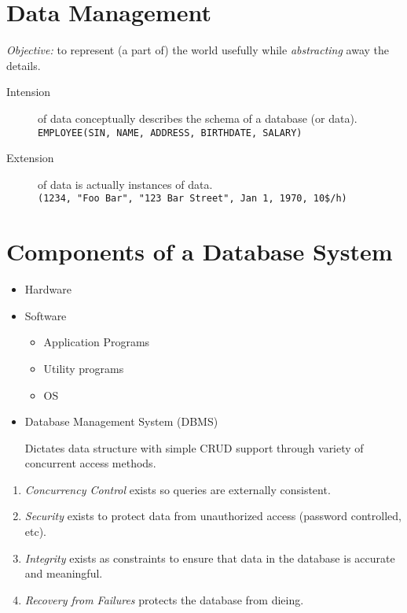             \section{Data Management} %
            \label{sec:data_management}
                \emph{Objective:} to represent (a part of) the world usefully while \emph{abstracting} away the details.
                \begin{description}
                    \item[Intension] of data conceptually describes the schema of a database (or data). \\
                        \verb|EMPLOYEE(SIN, NAME, ADDRESS, BIRTHDATE, SALARY)|
                    \item[Extension] of data is actually instances of data. \\
                        \verb|(1234, "Foo Bar", "123 Bar Street", Jan 1, 1970, 10$/h)|
                \end{description}
            \section{Components of a Database System} %
            \label{sec:components_of_a_database_system}
                \begin{itemize}
                    \item Hardware
                    \item Software
                        \begin{itemize}
                            \item Application Programs
                            \item Utility programs
                            \item OS
                        \end{itemize}
                    \item Database Management System (DBMS)

                        Dictates data structure with simple CRUD support through variety of concurrent access methods.
                \end{itemize}

                \begin{enumerate}
                    \item \emph{Concurrency Control} exists so queries are externally consistent.
                    \item \emph{Security} exists to protect data from unauthorized access (password controlled, etc).
                    \item \emph{Integrity} exists as constraints to ensure that data in the database is accurate and meaningful.
                    \item \emph{Recovery from Failures} protects the database from dieing.
                \end{enumerate}
